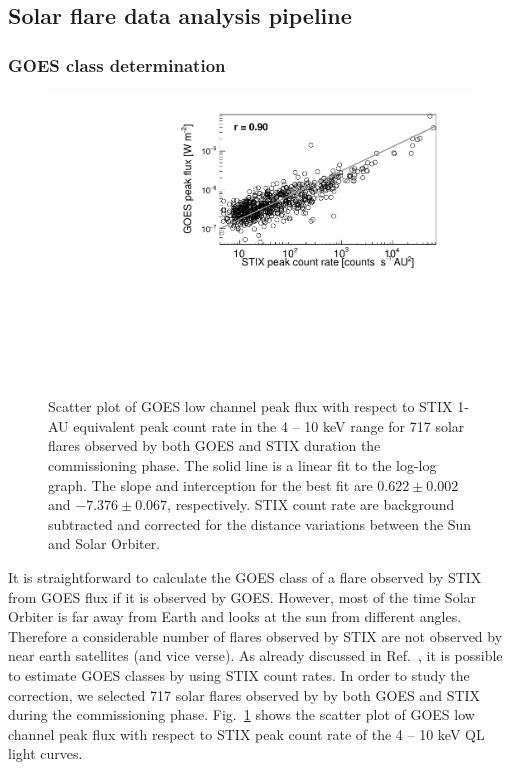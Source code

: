 \documentclass[referee]{aa} %
\begin{document}
\subsection{Solar flare data analysis pipeline}
\subsubsection{GOES class determination}
\begin{figure}
  \centering
  \includegraphics[width=0.8\linewidth]{figures/goes_stix_flux_paper.pdf}
  \caption{Scatter plot of GOES low channel peak flux with respect to STIX 1-AU equivalent  peak count rate in the 4 -- 10 keV range
  for 717 solar flares observed by both GOES and STIX duration the commissioning phase. 
  The solid line is a linear fit to the log-log graph. 
  The slope and 
  interception for the best fit are $0.622\pm 0.002$ and $-7.376\pm0.067$, respectively.
STIX count rate are background subtracted and corrected for the distance variations between the Sun and Solar Orbiter. 
}
\label{fig:goes-stix}
\end{figure}
It is straightforward to calculate the GOES
class of a flare observed by STIX from GOES flux if it is observed by GOES. 
However,  most of the time Solar Orbiter is far away from Earth and looks at 
the sun from different angles. Therefore a considerable number of flares observed by STIX
 are not observed by near earth satellites (and vice verse). 
As already discussed in Ref.~\cite{andrea2021}, 
it is possible to estimate GOES classes by using STIX count rates.
In order to study the correction, we selected 717 solar flares observed by 
by both GOES  and   STIX during the commissioning phase.   
Fig.~\ref{fig:goes-stix} shows the scatter plot of GOES low channel peak flux with respect to 
STIX peak count rate  of the 4 -- 10 keV QL light curves. 
\end{document}
